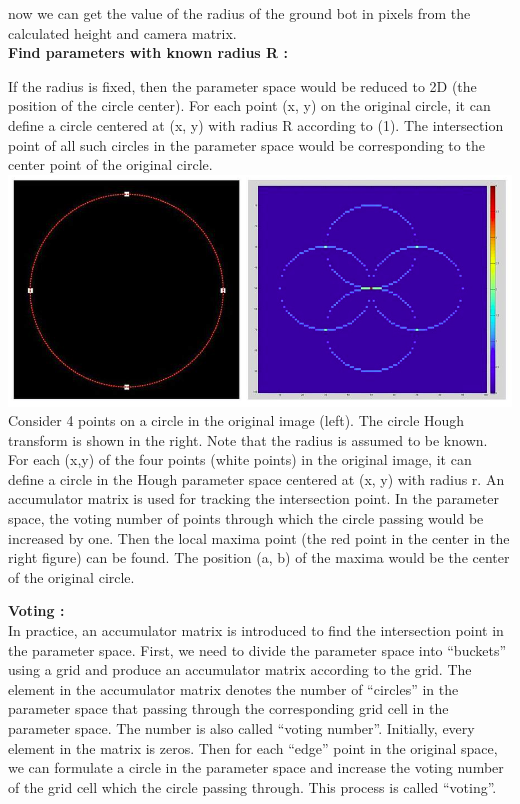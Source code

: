 \documentclass[letterpaper, 10 pt, conference]{ieeeconf}
\begin{document}
now we can get the value of the radius of the ground bot in pixels from the calculated height and camera matrix.\\

\textbf{Find parameters with known radius R :}

If the radius is fixed, then the parameter space would be reduced to 2D (the position of the circle center). For each point (x, y) on the original circle, it can define a circle centered at (x, y) with radius R according to (1). The intersection point of all such circles in the parameter space would be corresponding to the center point of the original circle. 
\includegraphics [scale =0.27]{houghCir1.png}
Consider 4 points on a circle in the original image (left). The circle Hough transform is shown in the right. Note that the radius is assumed to be known. For each (x,y) of the four points (white points) in the original image, it can define a circle in the Hough parameter space centered at (x, y) with radius r. An accumulator matrix is used for tracking the intersection point. In the parameter space, the voting number of points through which the circle passing would be increased by one. Then the local maxima point (the red point in the center in the right figure) can be found. The position (a, b) of the maxima would be the center of the original circle. 

\textbf{Voting :}\\
In practice, an accumulator matrix is introduced to find the intersection point in the parameter space. First, we need to divide the parameter space into “buckets” using a grid and produce an accumulator matrix according to the grid. The element in the accumulator matrix denotes the number of “circles” in the parameter space that passing through the corresponding grid cell in the parameter space. The number is also called “voting number”. Initially, every element in the matrix is zeros. Then for each “edge” point in the original space, we can formulate a circle in the parameter space and increase the voting number of the grid cell which the circle passing through. This process is called “voting”.\\
\end{document}
